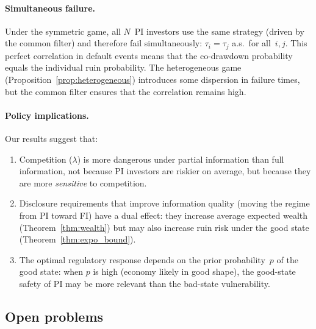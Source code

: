 \documentclass[12pt]{article}
\theoremstyle{remark}
\theoremstyle{definition}
\begin{document}
\paragraph{Simultaneous failure.}
Under the symmetric game, all $N$~PI investors use the same strategy
(driven by the common filter) and therefore fail simultaneously:
$\tau_i = \tau_j$ a.s.\ for all~$i, j$.
This perfect correlation in default events means that the co-drawdown
probability equals the individual ruin probability.
The heterogeneous game (Proposition~\ref{prop:heterogeneous}) introduces
some dispersion in failure times, but the common filter ensures
that the correlation remains high.

\paragraph{Policy implications.}
Our results suggest that:
\begin{enumerate}[label=(\roman*)]
\item Competition ($\lambda$) is more dangerous under partial
  information than full information, not because PI investors are
  riskier on average, but because they are more \emph{sensitive}
  to competition.
\item Disclosure requirements that improve information quality
  (moving the regime from PI toward FI) have a dual effect:
  they increase average expected wealth
  (Theorem~\ref{thm:wealth})
  but may also increase ruin risk under the good state
  (Theorem~\ref{thm:expo_bound}).
\item The optimal regulatory response depends on the prior
  probability~$p$ of the good state: when $p$ is high
  (economy likely in good shape), the good-state safety of PI
  may be more relevant than the bad-state vulnerability.
\end{enumerate}


\subsection{Open problems}\label{sec:open}
\end{document}
